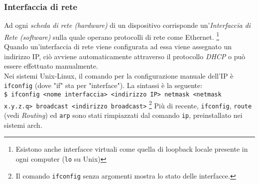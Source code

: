 \documentclass[a4paper,11pt]{article}
\def\code#1{\texttt{#1}}
\begin{document}
\subsubsection{Interfaccia di rete}
Ad ogni \textit{scheda di rete (hardware)} di un dispositivo corrisponde un'\textit{Interfaccia di Rete (software)} sulla quale operano protocolli di rete come Ethernet. \footnote{Esistono anche interfacce virtuali come quella di loopback locale presente in ogni computer (\code{lo} su Unix)}\\
Quando un'interfaccia di rete viene configurata ad essa viene assegnato un indirizzo IP, ciò avviene automaticamente attraverso il protocollo \textit{DHCP} o può essere effettuato manualmente.
\\Nei sistemi Unix-Linux, il comando per la configurazione manuale dell'IP è \code{ifconfig} (dove "if" sta per "interface"). La sintassi è la seguente:
\\ \code{\$ ifconfig <nome interfaccia> <indirizzo IP> netmask <netmask\\ x.y.z.q> broadcast <indirizzo broadcast>} \footnote{Il comando \code{ifconfig} senza argomenti mostra lo stato delle interfacce.} %
Più di recente, \code{ifconfig}, \code{route} (vedi \textit{Routing}) ed \code{arp} sono stati rimpiazzati dal comando \code{ip}, preinstallato nei sistemi arch.
\newpage
\end{document}
